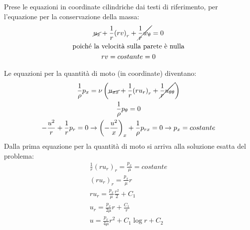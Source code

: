 Prese le equazioni in coordinate cilindriche dai testi di riferimento, per l'equazione per la conservazione della massa:
%
	\begin{equation*}
		\begin{gathered}
			\cancel{u_x} + \frac{1}{r} {(rv)}_r + \cancel{\frac{1}{r} w_{\theta}} = 0\\
			\text{poiché la velocità sulla parete è nulla}\\
			rv = costante = 0\\
		\end{gathered}
	\end{equation*}

Le equazioni per la quantità di moto (in coordinate) diventano:
%
	\begin{equation*}
		\begin{gathered}
			\frac{1}{\rho} p_x = \nu \left( \cancel{u_{xx}} + \frac{1}{r} {(r u_r)}_r + \cancel{\frac{1}{r} u_{\theta \theta}} \right)\\
			\frac{1}{\rho} p_{\theta} = 0\\
			- \frac{u^2}{r} + \frac{1}{r} p_r = 0 \rightarrow {\left( - \frac{u^2}{x} \right)}_x + \frac{1}{\rho} p_{rx} = 0 \rightarrow p_x = costante
		\end{gathered}
	\end{equation*}
%
Dalla prima equazione per la quantità di moto si arriva alla soluzione esatta del problema:
%
	\begin{equation*}
		\begin{gathered}
			\frac{1}{r} {(r u_r)}_r = \frac{p_x}{\mu} = costante\\
			{(r u_r)}_r = \frac{p_x}{\mu} r\\
			r u_r = \frac{p_x}{\mu} \frac{r^2}{2} + C_1\\
			u_r = \frac{p_x}{2 \mu} r + \frac{C_1}{r}\\
			u = \frac{p_x}{4 \mu} r^2 + C_1 \log{r}  + C_2
		\end{gathered}
	\end{equation*}
%

